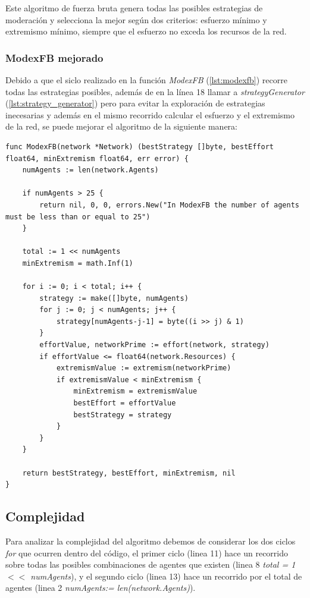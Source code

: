 \documentclass[letterpaper,10pt]{article}
\begin{document}
Este algoritmo de fuerza bruta genera todas las posibles estrategias de moderación y selecciona la mejor según dos criterios: esfuerzo mínimo y extremismo mínimo, siempre que el esfuerzo no exceda los recursos de la red.
\subsubsection*{ModexFB mejorado}

Debido a que el siclo realizado en la función \textit{ModexFB} (\ref{lst:modexfb}) recorre todas las estrategias posibles, además de en la línea 18 llamar a \textit{strategyGenerator} (\ref{lst:strategy_generator}) pero para evitar la exploración de estrategias inecesarias y además en el mismo recorrido calcular el esfuerzo y el extremismo de la red, se puede mejorar el algoritmo de la siguiente manera:
\begin{lstlisting}[caption={ModexFB mejorado}, label={lst:modexfb_mejorado}]
func ModexFB(network *Network) (bestStrategy []byte, bestEffort float64, minExtremism float64, err error) {
	numAgents := len(network.Agents)

	if numAgents > 25 {
		return nil, 0, 0, errors.New("In ModexFB the number of agents must be less than or equal to 25")
	}

	total := 1 << numAgents
	minExtremism = math.Inf(1)

	for i := 0; i < total; i++ {
		strategy := make([]byte, numAgents)
		for j := 0; j < numAgents; j++ {
			strategy[numAgents-j-1] = byte((i >> j) & 1)
		}
		effortValue, networkPrime := effort(network, strategy)
		if effortValue <= float64(network.Resources) {
			extremismValue := extremism(networkPrime)
			if extremismValue < minExtremism {
				minExtremism = extremismValue
				bestEffort = effortValue
				bestStrategy = strategy
			}
		}
	}

	return bestStrategy, bestEffort, minExtremism, nil
}
\end{lstlisting}
\subsection{Complejidad}
\label{subsec:complejidad_fuerza_bruta}
Para analizar la complejidad del algoritmo debemos de considerar los dos ciclos \textit{for} que ocurren dentro del código, el primer ciclo (linea 11) hace un recorrido sobre todas las posibles combinaciones de agentes que existen (linea 8 \textit{total = 1 $<<$ numAgents}), y el segundo ciclo (linea 13) hace un recorrido por el total de agentes (linea 2 \textit{numAgents:= len(network.Agents)}).
\end{document}
